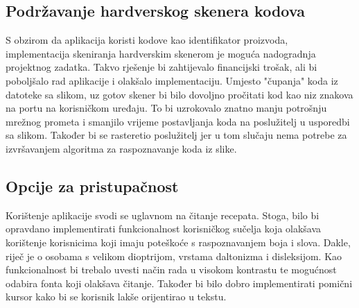 		\subsection{Podržavanje hardverskog skenera kodova}
			S obzirom da aplikacija koristi kodove kao identifikator proizvoda, implementacija skeniranja hardverskim skenerom je moguća nadogradnja projektnog zadatka. Takvo rješenje bi zahtijevalo financijski trošak, ali bi poboljšalo rad aplikacije i olakšalo implementaciju. Umjesto "čupanja" koda iz datoteke sa slikom, uz gotov skener bi bilo dovoljno pročitati kod kao niz znakova na portu na korisničkom uređaju. To bi uzrokovalo znatno manju potrošnju mrežnog prometa i smanjilo vrijeme postavljanja koda na poslužitelj u usporedbi sa slikom. Također bi se rasteretio poslužitelj jer u tom slučaju nema potrebe za izvršavanjem algoritma za raspoznavanje koda iz slike.
	
		\subsection{Opcije za pristupačnost}
 			Korištenje aplikacije svodi se uglavnom na čitanje recepata. Stoga, bilo bi opravdano implementirati funkcionalnost korisničkog sučelja koja olakšava korištenje korisnicima koji imaju poteškoće s raspoznavanjem boja i slova. Dakle, riječ je o osobama s velikom dioptrijom, vrstama daltonizma i disleksijom. Kao funkcionalnost bi trebalo uvesti način rada u visokom kontrastu te mogućnost odabira fonta koji olakšava čitanje. Također bi bilo dobro implementirati pomični kursor kako bi se korisnik lakše orijentirao u tekstu. 

		
